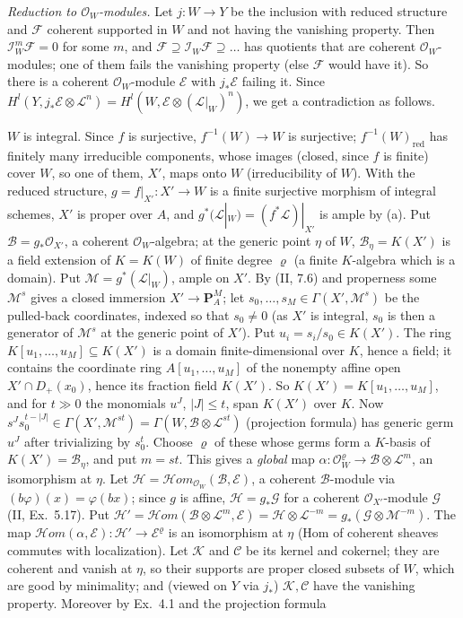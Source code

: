 \documentclass[11pt]{article}
\begin{document}
\emph{Reduction to $\mathcal O_W$-modules.} Let $j\colon W\to Y$ be the inclusion with reduced structure and $\mathcal F$ coherent supported in $W$ and not having the vanishing property. Then $\mathcal I_W^m\mathcal F=0$ for some $m$, and $\mathcal F\supseteq\mathcal I_W\mathcal F\supseteq\dots$ has quotients that are coherent $\mathcal O_W$-modules; one of them fails the vanishing property (else $\mathcal F$ would have it). So there is a coherent $\mathcal O_W$-module $\mathcal E$ with $j_*\mathcal E$ failing it. Since $H^l(Y,j_*\mathcal E\otimes\mathcal L^n)=H^l(W,\mathcal E\otimes(\mathcal L|_W)^n)$, we get a contradiction as follows.

$W$ is integral. Since $f$ is surjective, $f^{-1}(W)\to W$ is surjective; $f^{-1}(W)_{\mathrm{red}}$ has finitely many irreducible components, whose images (closed, since $f$ is finite) cover $W$, so one of them, $X'$, maps onto $W$ (irreducibility of $W$). With the reduced structure, $g=f|_{X'}\colon X'\to W$ is a finite surjective morphism of integral schemes, $X'$ is proper over $A$, and $g^*(\mathcal L|_W)=(f^*\mathcal L)|_{X'}$ is ample by (a). Put $\mathcal B=g_*\mathcal O_{X'}$, a coherent $\mathcal O_W$-algebra; at the generic point $\eta$ of $W$, $\mathcal B_\eta=K(X')$ is a field extension of $K=K(W)$ of finite degree $\varrho$ (a finite $K$-algebra which is a domain). Put $\mathcal M=g^*(\mathcal L|_W)$, ample on $X'$. By (II, 7.6) and properness some $\mathcal M^s$ gives a closed immersion $X'\to\mathbf P^M_A$; let $s_0,\dots,s_M\in\Gamma(X',\mathcal M^s)$ be the pulled-back coordinates, indexed so that $s_0\ne0$ (as $X'$ is integral, $s_0$ is then a generator of $\mathcal M^s$ at the generic point of $X'$). Put $u_i=s_i/s_0\in K(X')$. The ring $K[u_1,\dots,u_M]\subseteq K(X')$ is a domain finite-dimensional over $K$, hence a field; it contains the coordinate ring $A[u_1,\dots,u_M]$ of the nonempty affine open $X'\cap D_+(x_0)$, hence its fraction field $K(X')$. So $K(X')=K[u_1,\dots,u_M]$, and for $t\gg0$ the monomials $u^J$, $|J|\le t$, span $K(X')$ over $K$. Now $s^Js_0^{t-|J|}\in\Gamma(X',\mathcal M^{st})=\Gamma(W,\mathcal B\otimes\mathcal L^{st})$ (projection formula) has generic germ $u^J$ after trivializing by $s_0^t$. Choose $\varrho$ of these whose germs form a $K$-basis of $K(X')=\mathcal B_\eta$, and put $m=st$. This gives a \emph{global} map $\alpha\colon\mathcal O_W^{\varrho}\to\mathcal B\otimes\mathcal L^m$, an isomorphism at $\eta$. Let $\mathcal H=\mathcal Hom_{\mathcal O_W}(\mathcal B,\mathcal E)$, a coherent $\mathcal B$-module via $(b\varphi)(x)=\varphi(bx)$; since $g$ is affine, $\mathcal H=g_*\mathcal G$ for a coherent $\mathcal O_{X'}$-module $\mathcal G$ (II, Ex.~5.17). Put $\mathcal H'=\mathcal Hom(\mathcal B\otimes\mathcal L^m,\mathcal E)=\mathcal H\otimes\mathcal L^{-m}=g_*(\mathcal G\otimes\mathcal M^{-m})$. The map $\mathcal Hom(\alpha,\mathcal E)\colon\mathcal H'\to\mathcal E^{\varrho}$ is an isomorphism at $\eta$ (Hom of coherent sheaves commutes with localization). Let $\mathcal K$ and $\mathcal C$ be its kernel and cokernel; they are coherent and vanish at $\eta$, so their supports are proper closed subsets of $W$, which are good by minimality; and (viewed on $Y$ via $j_*$) $\mathcal K,\mathcal C$ have the vanishing property. Moreover by Ex.~4.1 and the projection formula
\end{document}
